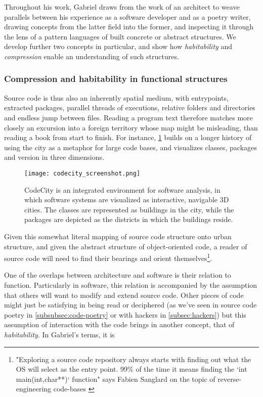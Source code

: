 Throughout his work, Gabriel draws from the work of an architect to weave parallels between his experience as a software developer and as a poetry writer, drawing concepts from the latter field into the former, and inspecting it through the lens of a pattern languages of built concrete or abstract structures. We develop further two concepts in particular, and show how \emph{habitability} and \emph{compression} enable an understanding of such structures.

\subsubsection{Compression and habitability in functional structures}
\label{subsubsec:compression-habitability}

Source code is thus also an inherently spatial medium, with entrypoints, extracted packages, parallel threads of executions, relative folders and directories and endless jump between files. Reading a program text therefore matches more closely an excursion into a foreign territory whose map might be misleading, than reading a book from start to finish. For instance, \ref{graphic:code-city} builds on a longer history of using the city as a metaphor for large code bases, and visualizes classes, packages and version in three dimensions.

\begin{figure}
    \texttt{[image: codecity\_screenshot.png]}
    \caption{CodeCity is an integrated environment for software analysis, in which software systems are visualized as interactive, navigable 3D cities. The classes are represented as buildings in the city, while the packages are depicted as the districts in which the buildings reside. \citep{wettel_codecity_2008}}
    \label{graphic:code-city}
\end{figure}

Given this somewhat literal mapping of source code structure onto urban structure, and given the abstract structure of object-oriented code, a reader of source code will need to find their bearings and orient themselves\footnote{"Exploring a source code repository always starts with finding out what the OS will select as  the entry point. 99\% of the time it means finding the `int main(int,char**)` function" says Fabien Sanglard on the topic of reverse-engineering code-bases \citep{sanglard_game_2018}}.

One of the overlaps between architecture and software is their relation to function. Particularly in software, this relation is accompanied by the assumption that others will want to modify and extend source code. Other pieces of code might just be satisfying in being read or deciphered (as we've seen in source code poetry in \ref{subsubsec:code-poetry} or with hackers in \ref{subsec:hackers}) but this assumption of interaction with the code brings in another concept, that of \emph{habitability}. In Gabriel's terms, it is

